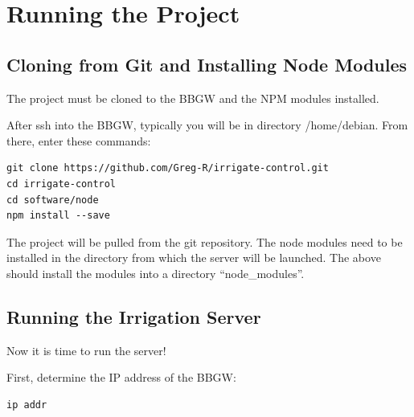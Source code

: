 %
%
%

\chapter{Running the Project}

\section{Cloning from Git and Installing Node Modules}

The project must be cloned to the BBGW and the NPM modules installed.

After ssh into the BBGW, typically you will be in directory /home/debian.
From there, enter these commands:

\begin{verbatim}
git clone https://github.com/Greg-R/irrigate-control.git
cd irrigate-control
cd software/node
npm install --save
\end{verbatim}

The project will be pulled from the git repository.  The node modules need to 
be installed in the directory from which the server will be launched.
The above should install the modules into a directory ``node\_modules''.

\section{Running the Irrigation Server}

Now it is time to run the server!

First, determine the IP address of the BBGW:

\begin{verbatim}
ip addr
\end{verbatim}

